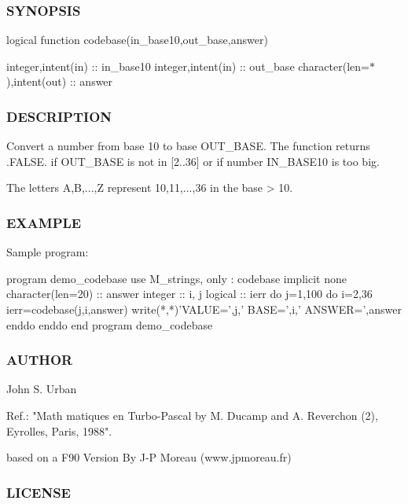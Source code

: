 \subsubsection*{S\+Y\+N\+O\+P\+S\+IS}

logical function codebase(in\+\_\+base10,out\+\_\+base,answer)

integer,intent(in) \+:\+: in\+\_\+base10 integer,intent(in) \+:\+: out\+\_\+base character(len=$\ast$),intent(out) \+:\+: answer \subsubsection*{D\+E\+S\+C\+R\+I\+P\+T\+I\+ON}

\begin{DoxyVerb}Convert a number from base 10 to base OUT_BASE. The function returns
.FALSE. if OUT_BASE is not in [2..36] or if number IN_BASE10 is
too big.

The letters A,B,...,Z represent 10,11,...,36 in the base > 10.
\end{DoxyVerb}


\subsubsection*{E\+X\+A\+M\+P\+LE}

Sample program\+: \begin{DoxyVerb}program demo_codebase
use M_strings, only : codebase
implicit none
character(len=20) :: answer
integer           :: i, j
logical           :: ierr
do j=1,100
   do i=2,36
      ierr=codebase(j,i,answer)
      write(*,*)'VALUE=',j,' BASE=',i,' ANSWER=',answer
   enddo
enddo
end program demo_codebase
\end{DoxyVerb}


\subsubsection*{A\+U\+T\+H\+OR}

John S. Urban

Ref.\+: "Math matiques en Turbo-\/\+Pascal by M. Ducamp and A. Reverchon (2), Eyrolles, Paris, 1988".

based on a F90 Version By J-\/P Moreau (www.\+jpmoreau.\+fr)

\subsubsection*{L\+I\+C\+E\+N\+SE}

